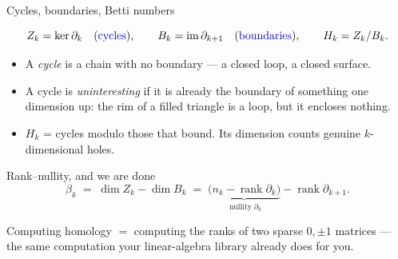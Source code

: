 \documentclass[10pt,aspectratio=169]{beamer}
\newcommand{\im}{\operatorname{im}}
\newcommand{\rank}{\operatorname{rank}}
\newcommand{\nullity}{\operatorname{nullity}}
\newcommand{\HL}[1]{\textcolor{blue!70!black}{#1}}
\begin{document}
    \begin{frame}[shrink=8]{Cycles, boundaries, Betti numbers}
        \begin{block}{}
            \[
                Z_k=\ker\partial_k \quad\text{(\HL{cycles})},\qquad
                B_k=\im\partial_{k+1}\quad\text{(\HL{boundaries})},\qquad
                H_k = Z_k/B_k .
            \]
        \end{block}

        \vspace{0.3em}
        \begin{itemize}
            \item A \emph{cycle} is a chain with no boundary --- a closed loop, a closed surface.
            \item A cycle is \emph{uninteresting} if it is already the boundary of something one
            dimension up: the rim of a filled triangle is a loop, but it encloses nothing.
            \item $H_k$ = cycles \alert{modulo} those that bound. Its dimension counts genuine
            $k$-dimensional holes.
        \end{itemize}

        \vspace{0.5em}

        \begin{alertblock}{Rank--nullity, and we are done}
            \[
                \beta_k \;=\;\dim Z_k-\dim B_k
                \;=\;\underbrace{\bigl(n_k-\rank\partial_k\bigr)}_{\nullity\partial_k}-\rank\partial_{k+1}.
            \]
        \end{alertblock}
        Computing homology $=$ computing the ranks of two sparse $0,\pm1$ matrices --- the
        same computation your linear-algebra library already does for you.
    \end{frame}
\end{document}
